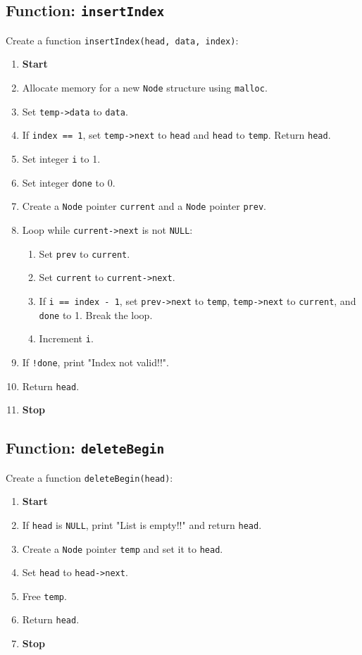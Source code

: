 {  \subsection{Function: \texttt{insertIndex}}
  Create a function \texttt{insertIndex(head, data, index)}:
  \begin{enumerate}[label=\arabic*:,left=0pt]
    \item \textbf{Start}
    \item Allocate memory for a new \texttt{Node} structure using \texttt{malloc}.
    \item Set \texttt{temp->data} to \texttt{data}.
    \item If \texttt{index == 1}, set \texttt{temp->next} to \texttt{head} and \texttt{head} to \texttt{temp}. Return \texttt{head}.
    \item Set integer \texttt{i} to 1.
    \item Set integer \texttt{done} to 0.
    \item Create a \texttt{Node} pointer \texttt{current} and a \texttt{Node} pointer \texttt{prev}.
    \item Loop while \texttt{current->next} is not \texttt{NULL}:
          \begin{enumerate}[label=2.\arabic*:, start=1]
            \item Set \texttt{prev} to \texttt{current}.
            \item Set \texttt{current} to \texttt{current->next}.
            \item If \texttt{i == index - 1}, set \texttt{prev->next} to \texttt{temp}, \texttt{temp->next} to \texttt{current}, and \texttt{done} to 1. Break the loop.
            \item Increment \texttt{i}.
          \end{enumerate}
    \item If \texttt{!done}, print "Index not valid!!".
    \item Return \texttt{head}.
    \item \textbf{Stop}
  \end{enumerate}

  \subsection{Function: \texttt{deleteBegin}}
  Create a function \texttt{deleteBegin(head)}:
  \begin{enumerate}[label=\arabic*:,left=0pt]
    \item \textbf{Start}
    \item If \texttt{head} is \texttt{NULL}, print "List is empty!!" and return \texttt{head}.
    \item Create a \texttt{Node} pointer \texttt{temp} and set it to \texttt{head}.
    \item Set \texttt{head} to \texttt{head->next}.
    \item Free \texttt{temp}.
    \item Return \texttt{head}.
    \item \textbf{Stop}
  \end{enumerate}

}
